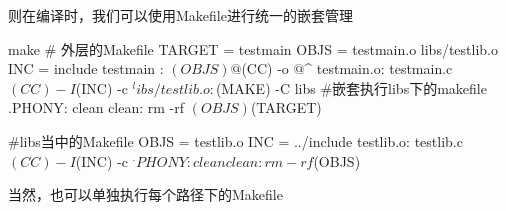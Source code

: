 则在编译时，我们可以使用Makefile进行统一的嵌套管理
\begin{code-block}{make}
# 外层的Makefile
TARGET = testmain
OBJS = testmain.o libs/testlib.o
INC = include
testmain : $(OBJS)
        @$(CC) -o $@ $^
testmain.o: testmain.c
        $(CC) -I$(INC) -c $^
libs/testlib.o:
        $(MAKE) -C libs #嵌套执行libs下的makefile
.PHONY: clean
clean:
        rm -rf $(OBJS) $(TARGET)

#libs当中的Makefile
OBJS = testlib.o
INC = ../include
testlib.o: testlib.c
        $(CC) -I$(INC) -c $^
.PHONY: clean
clean:
        rm -rf $(OBJS)
\end{code-block}

当然，也可以单独执行每个路径下的Makefile
